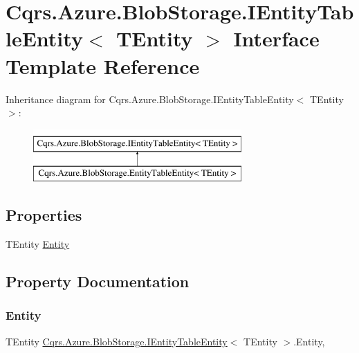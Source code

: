 \hypertarget{interfaceCqrs_1_1Azure_1_1BlobStorage_1_1IEntityTableEntity}{}\section{Cqrs.\+Azure.\+Blob\+Storage.\+I\+Entity\+Table\+Entity$<$ T\+Entity $>$ Interface Template Reference}
\label{interfaceCqrs_1_1Azure_1_1BlobStorage_1_1IEntityTableEntity}
Inheritance diagram for Cqrs.\+Azure.\+Blob\+Storage.\+I\+Entity\+Table\+Entity$<$ T\+Entity $>$\+:\begin{figure}[H]
\begin{center}
\leavevmode
\includegraphics[height=2.000000cm]{interfaceCqrs_1_1Azure_1_1BlobStorage_1_1IEntityTableEntity}
\end{center}
\end{figure}
\subsection*{Properties}
\begin{DoxyCompactItemize}
\item 
T\+Entity \hyperlink{interfaceCqrs_1_1Azure_1_1BlobStorage_1_1IEntityTableEntity_a06bd38e994772fa43bf8f456c1b3d6e2}{Entity}
\end{DoxyCompactItemize}


\subsection{Property Documentation}
\mbox{\label{interfaceCqrs_1_1Azure_1_1BlobStorage_1_1IEntityTableEntity_a06bd38e994772fa43bf8f456c1b3d6e2}} 
\subsubsection{\texorpdfstring{Entity}{Entity}}
{\footnotesize\ttfamily T\+Entity \hyperlink{interfaceCqrs_1_1Azure_1_1BlobStorage_1_1IEntityTableEntity}{Cqrs.\+Azure.\+Blob\+Storage.\+I\+Entity\+Table\+Entity}$<$ T\+Entity $>$.Entity\hspace{0.3cm}{\ttfamily [get]}, {\ttfamily [set]}}

